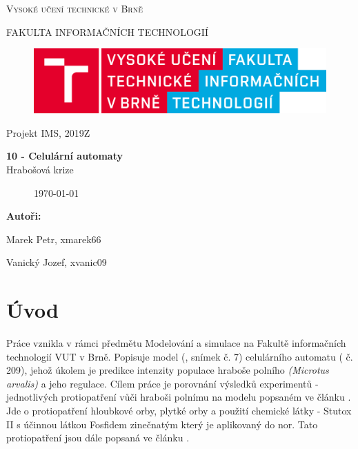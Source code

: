 \documentclass[a4paper,11pt]{article}
\begin{document}

\begin{titlepage}
\begin{center}
    {\Huge \textsc{Vysoké učení technické v Brně}}
    
    {\LARGE \uppercase{FAKULTA INFORMAČNÍCH TECHNOLOGIÍ}}
    
\begin{figure}[h]
\vspace{5.0cm}
\centering
\includegraphics[scale=0.15]{logo.png}
\vspace{-10.0cm}
\end{figure}
    
	{\LARGE Projekt IMS, 2019Z}

	{\Huge \textbf{10 - Celulární automaty}}
\\

{\LARGE {Hrabošová krize}}\\

\begin{figure}[h]
\centering
{\Large {\mydate\today}}
\vspace{6cm}
\end{figure}

\end{center}
\begin{compactitem}
\item[] \textbf{Autoři:}
\item[] Marek Petr, xmarek66
\item[] Vanický Jozef, xvanic09
\end{compactitem}

\end{titlepage}

\tableofcontents
\newpage

\section{Úvod}
Práce vznikla v rámci předmětu Modelování a simulace na Fakultě informačních technologií VUT v Brně. Popisuje model (\cite{slajdy}, snímek č. 7) celulárního automatu (\cite{slajdy} č. 209), jehož úkolem je predikce intenzity populace hraboše polního \textit{(Microtus arvalis)} a jeho regulace. Cílem práce je porovnání výsledků experimentů - jednotlivých protiopatření vůči hraboši polnímu na modelu popsaném ve článku \cite{OurCA}. Jde o protiopatření hloubkové orby, plytké orby a použití chemické látky - Stutox II s účinnou látkou Fosfidem zinečnatým který je aplikovaný do nor. Tato protiopatření jsou dále popsaná ve článku \cite{ochrana}.
\end{document}
